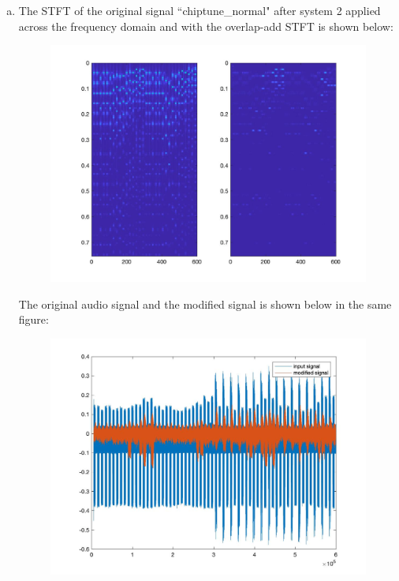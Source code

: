 \documentclass[a4paper]{article}
\begin{document}
\begin{spacing}{2.0}
\begin{enumerate}[(a)]
\item The STFT of the original signal ``chiptune\_normal" after system 2 applied across the frequency domain and with the overlap-add STFT is shown below:
\begin{figure}[H]
\centering
\includegraphics[width=5in]{4b.jpg}
\label{fig:graph}
\end{figure}
The original audio signal and the modified signal is shown below in the same figure:
\begin{figure}[H]
\centering
\includegraphics[width=5in]{4b_audio.jpg}
\label{fig:graph}
\end{figure}


\end{enumerate}
\end{spacing}
\end{document}
